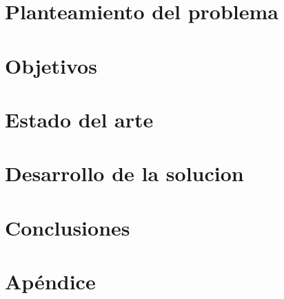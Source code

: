 \documentclass[book,spanish,a4paper,12pt]{tfg}
\begin{document}
\chapter{Planteamiento del problema}


\chapter{Objetivos}


\chapter{Estado del arte}


\chapter{Desarrollo de la solucion}

% 

% 

% 


\chapter{Conclusiones}



\pagestyle{appendix}

\appendix
\chapter{Apéndice}




\end{document}
